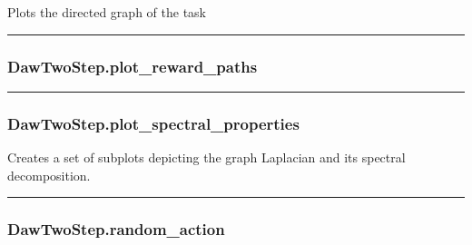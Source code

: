Plots the directed graph of the task

\begin{center}\rule{0.5\linewidth}{\linethickness}\end{center}

\subsubsection{DawTwoStep.plot\_reward\_paths}\label{dawtwostep.plot_reward_paths}

\begin{Shaded}
\begin{Highlighting}[]
\OperatorTok{=}\OperatorTok{=}\OperatorTok{=}\NormalTok{)}
\end{Highlighting}
\end{Shaded}

\begin{center}\rule{0.5\linewidth}{\linethickness}\end{center}

\subsubsection{DawTwoStep.plot\_spectral\_properties}\label{dawtwostep.plot_spectral_properties}

\begin{Shaded}
\begin{Highlighting}[]
\OperatorTok{=}\OperatorTok{=}\OperatorTok{=}\NormalTok{)}
\end{Highlighting}
\end{Shaded}

Creates a set of subplots depicting the graph Laplacian and its spectral
decomposition.

\begin{center}\rule{0.5\linewidth}{\linethickness}\end{center}

\subsubsection{DawTwoStep.random\_action}\label{dawtwostep.random_action}

